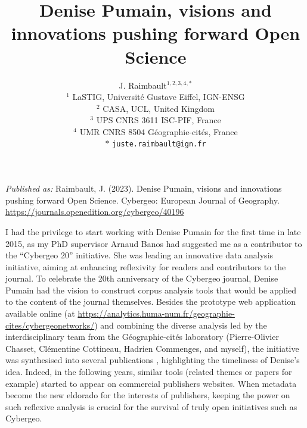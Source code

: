 \documentclass[11pt]{article}
\title{Denise Pumain, visions and innovations pushing forward Open Science}
\author{J. Raimbault$^{1,2,3,4,\ast}$\medskip\\
$^{1}$ LaSTIG, Universit{\'e} Gustave Eiffel, IGN-ENSG\\
$^{2}$ CASA, UCL, United Kingdom\\
$^{3}$ UPS CNRS 3611 ISC-PIF, France\\
$^{4}$ UMR CNRS 8504 G{\'e}ographie-cit{\'e}s, France\\
$\ast$ \texttt{juste.raimbault@ign.fr}
}
\date{}
\begin{document}
{\justify \textit{Published as: } Raimbault, J. (2023). Denise Pumain, visions and innovations pushing forward Open Science. Cybergeo: European Journal of Geography. \url{https://journals.openedition.org/cybergeo/40196}}


{\let\newpage\relax\maketitle}

\begin{abstract}
	
\end{abstract}


\bigskip


I had the privilege to start working with Denise Pumain for the first time in late 2015, as my PhD supervisor Arnaud Banos had suggested me as a contributor to the ``Cybergeo 20'' initiative. She was leading an innovative data analysis initiative, aiming at enhancing reflexivity for readers and contributors to the journal. To celebrate the 20th anniversary of the Cybergeo journal, Denise Pumain had the vision to construct corpus analysis tools that would be applied to the content of the journal themselves. Besides the prototype web application available online (at \url{https://analytics.huma-num.fr/geographie-cites/cybergeonetworks/}) and combining the diverse analysis led by the interdisciplinary team from the Géographie-cités laboratory (Pierre-Olivier Chasset, Clémentine Cottineau, Hadrien Commenges, and myself), the initiative was synthesised into several publications  \citep{cottineau2017cybergeonetworks,raimbault2021empowering,raimbault2019exploration}, highlighting the timeliness of Denise’s idea. Indeed, in the following years, similar tools (related themes or papers for example) started to appear on commercial publishers websites. When metadata become the new eldorado for the interests of publishers, keeping the power on such reflexive analysis is crucial for the survival of truly open initiatives such as Cybergeo.
\end{document}
